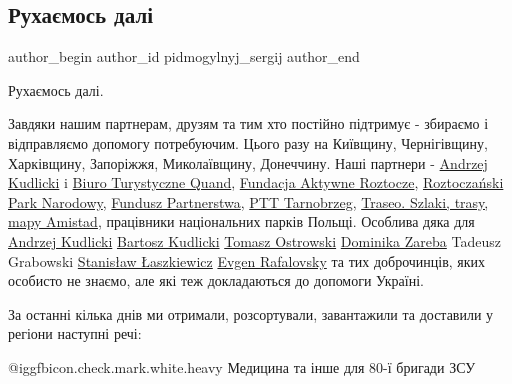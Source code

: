  
 
 
 
 
 
\subsection{Рухаємось далі}
\label{sec:08_04_2022.fb.pidmogylnyj_sergij.1.ruhaemos_dali}
 
\ifcmt
 author_begin
   author_id pidmogylnyj_sergij
 author_end
\fi

Рухаємось далі.

Завдяки нашим партнерам, друзям та тим хто постійно підтримує - збираємо і
відправляємо допомогу потребуючим. Цього разу на Київщину, Чернігівщину,
Харківщину, Запоріжжя, Миколаївщину, Донеччину. Наші партнери - \href{https://www.facebook.com/andrzej.kudlicki.5}{Andrzej
Kudlicki} i \href{https://www.facebook.com/bt.quand}{Biuro Turystyczne Quand}, \href{https://www.facebook.com/Fundacja-Aktywne-Roztocze-105436672088049}{Fundacja Aktywne Roztocze}, \href{https://www.facebook.com/RoztoczanskiPN}{Roztoczański
Park Narodowy}, \href{https://www.facebook.com/Fundusz.Partnerstwa}{Fundusz Partnerstwa}, 
\href{https://www.facebook.com/ptt.tarnobrzeg}{PTT Tarnobrzeg}, \href{https://www.facebook.com/Traseo}{Traseo. Szlaki, trasy, mapy
Amistad}, працівники національних парків Польщі. Особлива дяка для \href{https://www.facebook.com/andrzej.kudlicki.5}{Andrzej
Kudlicki} \href{https://www.facebook.com/bartosz.kudlicki}{Bartosz Kudlicki} \href{https://www.facebook.com/tomasz.ostrowski.714}{Tomasz Ostrowski} \href{https://www.facebook.com/ekoturystyka}{Dominika Zareba} Tadeusz Grabowski
\href{https://www.facebook.com/profile.php?id=100015203526124}{Stanisław Łaszkiewicz} \href{https://www.facebook.com/evgen.rafalovsky}{Evgen Rafalovsky} та тих доброчинців, яких особисто не
знаємо, але які теж докладаються до допомоги Україні. 

За останні кілька днів ми отримали, розсортували, завантажили та доставили у регіони наступні речі:

@igg{fbicon.check.mark.white.heavy}  Медицина та інше для 80-ї бригади ЗСУ

